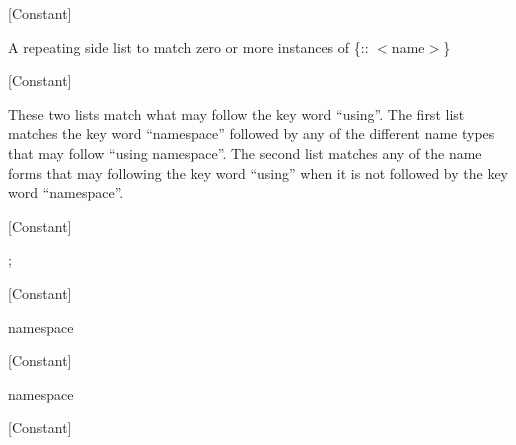 \vspace{1em}
\noindent
{}
\usebox{\funcname}
 \hfill [Constant]

\begin{doc-string}
A repeating side list to match zero or more instances of \{:: $<$name$>$\}
\end{doc-string}

\vspace{1em}
\noindent
{}
\usebox{\funcname}
 \hfill [Constant]

\begin{doc-string}
These two lists match what may follow the key word ``using''.  The first list
matches the key word ``namespace'' followed by any of the different name types
that may follow ``using namespace''.  The second list matches any of the name
forms that may following the key word ``using'' when it is not followed by the
key word ``namespace''.
\end{doc-string}

\vspace{1em}
\noindent
{}
\usebox{\funcname}
 \hfill [Constant]

\begin{doc-string}
;
\end{doc-string}

\vspace{1em}
\noindent
{}
\usebox{\funcname}
 \hfill [Constant]

\begin{doc-string}
namespace
\end{doc-string}

\vspace{1em}
\noindent
{}
\usebox{\funcname}
 \hfill [Constant]

\begin{doc-string}
namespace
\end{doc-string}

\vspace{1em}
\noindent
{}
\usebox{\funcname}
 \hfill [Constant]

